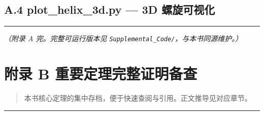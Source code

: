 \subsection{A.4 plot\_helix\_3d.py --- 3D
螺旋可视化}\label{a.4-plot_helix_3d.py-3d-ux87baux65cbux53efux89c6ux5316}

\begin{Shaded}
\begin{Highlighting}[]
\OperatorTok{=}\NormalTok{, }\OperatorTok{*}\NormalTok{)}
\OperatorTok{=}\OperatorTok{;}\OperatorTok{=}\OperatorTok{;}\OperatorTok{=}
\OperatorTok{=}\OperatorTok{=}\NormalTok{(}\NormalTok{,}\NormalTok{))}
\OperatorTok{=}\OperatorTok{=}\NormalTok{)}
\OperatorTok{=}\NormalTok{)}
\NormalTok{)}
\end{Highlighting}
\end{Shaded}

\begin{center}\rule{0.5\linewidth}{0.5pt}\end{center}

\emph{（附录 A 完。完整可运行版本见
\texttt{Supplemental\_Code/}，与本书同源维护。）}

\section{附录 B
重要定理完整证明备查}\label{ux9644ux5f55-b-ux91cdux8981ux5b9aux7406ux5b8cux6574ux8bc1ux660eux5907ux67e5}

\begin{quote}
本书核心定理的集中存档，便于快速查阅与引用。正文推导见对应章节。
\end{quote}

\begin{center}\rule{0.5\linewidth}{0.5pt}\end{center}

